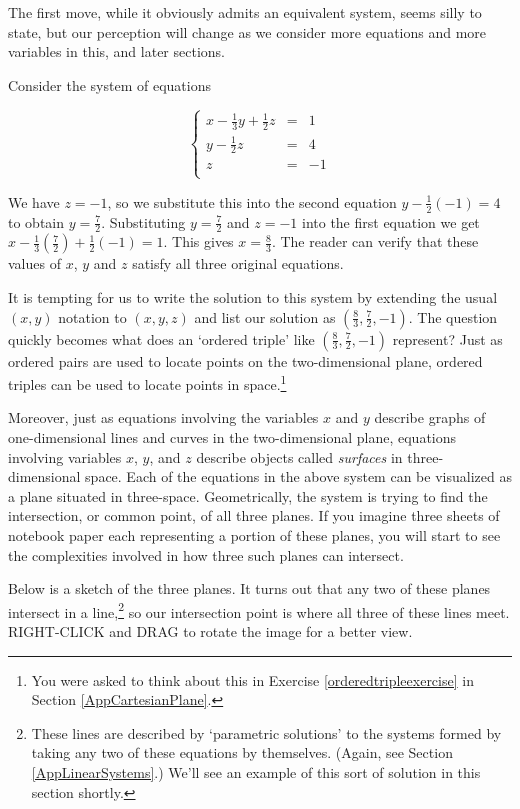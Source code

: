 \documentclass{ximera}
\begin{document}

 

 The first move, while it obviously admits an equivalent system, seems silly to state, but our perception will change as we consider more equations and more variables in this, and later sections.

 

Consider the system of equations 

\[ \left\{ \begin{array}{rcr} x-\frac{1}{3}y+\frac{1}{2}z  & = & 1 \\  
y - \frac{1}{2} z & = & 4 \\  
z & = & -1 \\ \end{array} \right.\]  

We have $z = -1$, so we substitute this into the second equation $y - \frac{1}{2} (-1) = 4$ to obtain $y = \frac{7}{2}$.  Substituting $y = \frac{7}{2}$ and $z=-1$ into the first equation we get $x - \frac{1}{3}\left(\frac{7}{2}\right) + \frac{1}{2}(-1) = 1$.  This gives $x = \frac{8}{3}$.  The reader can verify that these values of $x$, $y$ and $z$ satisfy all three original equations.  

It is tempting for us to write the solution to this system by extending the usual $(x,y)$ notation to $(x,y,z)$ and list our solution as $\left(\frac{8}{3},\frac{7}{2},-1\right)$.  The question quickly becomes what does an `ordered triple' like $\left(\frac{8}{3},\frac{7}{2},-1\right)$ represent?  Just as ordered pairs are used to locate points on the two-dimensional plane, ordered triples can be used to locate points in space.\footnote{You were asked to think about this in Exercise \ref{orderedtripleexercise} in Section \ref{AppCartesianPlane}.}  

Moreover, just as equations involving the variables $x$ and $y$ describe graphs of one-dimensional lines and curves in the two-dimensional plane, equations involving variables $x$, $y$, and $z$ describe objects called \textit{surfaces} in three-dimensional space.  Each of the equations in the above system can be visualized as a plane situated in three-space.  Geometrically, the system is trying to find the intersection, or common point, of all three planes. If you imagine three sheets of notebook paper each representing a portion of these planes, you will start to see the complexities involved in how three such planes can intersect. 

Below is a sketch of the three planes.  It turns out that any two of these planes intersect in a line,\footnote{These lines are described by `parametric solutions' to the systems formed by taking any two of these equations by themselves.  (Again, see Section \ref{AppLinearSystems}.) We'll see an example of this sort of solution in this section shortly.} so our intersection point is where all three of these lines meet. RIGHT-CLICK and DRAG to rotate the image for a better view.
\end{document}
